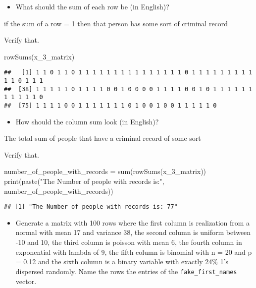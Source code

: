 \documentclass[
]{article}
\newenvironment{Shaded}{\begin{snugshade}}{\end{snugshade}}
\newcommand{\FunctionTok}[1]{\textcolor[rgb]{0.00,0.00,0.00}{#1}}
\newcommand{\NormalTok}[1]{#1}
\newcommand{\OtherTok}[1]{\textcolor[rgb]{0.56,0.35,0.01}{#1}}
\newcommand{\StringTok}[1]{\textcolor[rgb]{0.31,0.60,0.02}{#1}}
\providecommand{\tightlist}{%
  \setlength{\itemsep}{0pt}\setlength{\parskip}{0pt}}
\begin{document}
\begin{itemize}
\tightlist
\item
  What should the sum of each row be (in English)?
\end{itemize}

if the sum of a row = 1 then that person has some sort of criminal
record

Verify that.

\begin{Shaded}
\begin{Highlighting}[]
\FunctionTok{rowSums}\NormalTok{(x\_3\_matrix)}
\end{Highlighting}
\end{Shaded}

\begin{verbatim}
##   [1] 1 1 0 1 1 0 1 1 1 1 1 1 1 1 1 1 1 1 1 1 1 0 1 1 1 1 1 1 1 1 1 1 1 0 1 1 1
##  [38] 1 1 1 1 1 0 1 1 1 1 0 0 1 0 0 0 0 1 1 1 1 0 0 1 0 1 1 1 1 1 1 1 1 1 1 1 0
##  [75] 1 1 1 1 0 0 1 1 1 1 1 1 1 0 1 0 0 1 0 0 1 1 1 1 1 0
\end{verbatim}

\begin{itemize}
\tightlist
\item
  How should the column sum look (in English)?
\end{itemize}

The total sum of people that have a criminal record of some sort

Verify that.

\begin{Shaded}
\begin{Highlighting}[]
\NormalTok{number\_of\_people\_with\_records }\OtherTok{=} \FunctionTok{sum}\NormalTok{(}\FunctionTok{rowSums}\NormalTok{(x\_3\_matrix))}
\FunctionTok{print}\NormalTok{(}\FunctionTok{paste}\NormalTok{(}\StringTok{"The Number of people with records is:"}\NormalTok{, number\_of\_people\_with\_records))}
\end{Highlighting}
\end{Shaded}

\begin{verbatim}
## [1] "The Number of people with records is: 77"
\end{verbatim}

\begin{itemize}
\tightlist
\item
  Generate a matrix with 100 rows where the first column is realization
  from a normal with mean 17 and variance 38, the second column is
  uniform between -10 and 10, the third column is poisson with mean 6,
  the fourth column in exponential with lambda of 9, the fifth column is
  binomial with n = 20 and p = 0.12 and the sixth column is a binary
  variable with exactly 24\% 1's dispersed randomly. Name the rows the
  entries of the \texttt{fake\_first\_names} vector.
\end{itemize}
\end{document}
